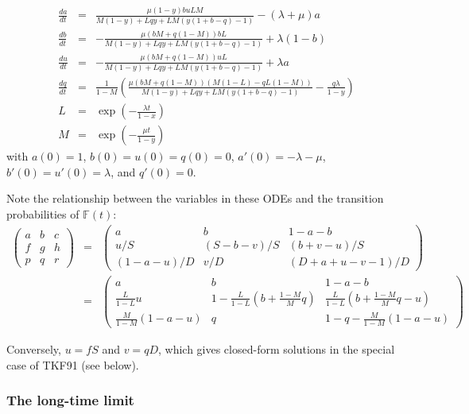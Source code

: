 \documentclass{article}
\begin{document}
\begin{eqnarray*}
  \frac{da}{dt} & = & \frac{\mu (1-y) b u L M}{M (1 - y) + L q y + L M (y (1 + b - q) - 1)} - (\lambda +\mu ) a \\
  \frac{db}{dt} & = & -\frac{\mu (bM+q(1-M)) b L}{M (1 - y) + L q y + L M (y (1 + b - q) - 1)} + \lambda (1-b) \\
  \frac{du}{dt} & = & -\frac{\mu (bM+q(1-M)) u L}{M (1 - y) + L q y + L M (y (1 + b - q) - 1)} + \lambda a \\
  \frac{dq}{dt} & = & \frac{1}{1-M} \left( \frac{\mu (bM+q(1-M)) (M(1-L)-qL(1-M))}{M (1 - y) + L q y + L M (y (1 + b - q) - 1)} - \frac{q \lambda}{1-y} \right) \\
  L & = & \exp\left(-\frac{\lambda t}{1-x}\right) \\
  M & = & \exp\left(-\frac{\mu t}{1-y}\right)
\end{eqnarray*}
with $a(0)=1$, $b(0)=u(0)=q(0)=0$,
$a'(0)=-\lambda-\mu$, $b'(0)=u'(0)=\lambda$, and $q'(0)=0$.

Note the relationship between the variables in these ODEs and the transition probabilities of $\mathbb{F}(t)$:
\begin{eqnarray*}
\begin{pmatrix}
a & b & c \\
f & g & h \\
p & q & r 
\end{pmatrix}
& = &
\begin{pmatrix}
a & b & 1-a-b \\
u/S & (S-b-v)/S & (b+v-u)/S \\
(1-a-u)/D & v/D & (D+a+u-v-1)/D 
\end{pmatrix}
\\
& = &
\begin{pmatrix}
a & b & 1-a-b \\
\frac{L}{1-L} u & 1 - \frac{L}{1-L} \left( b + \frac{1-M}{M} q \right) & \frac{L}{1-L} (b + \frac{1-M}{M} q - u) \\
\frac{M}{1-M} (1 - a - u) & q & 1 - q -  \frac{M}{1-M} \left( 1 - a - u \right)
\end{pmatrix}
\end{eqnarray*}

Conversely, $u=fS$ and $v=qD$, which gives closed-form solutions in the special case of TKF91 (see below).


\subsubsection{The long-time limit}
\end{document}

